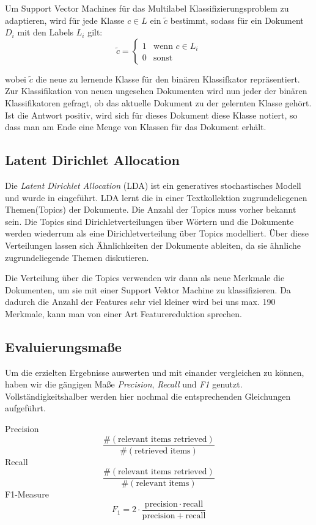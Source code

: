 Um Support Vector Machines für das Multilabel Klassifizierungsproblem zu adaptieren, wird für jede Klasse $c \in L$ ein $\tilde c$ bestimmt, sodass für ein Dokument $D_i$ mit den Labels $L_i$ gilt:
\[
    \tilde c =
    \begin{cases}
        1 &\mbox{wenn } c \in L_i \\
        0 &\mbox{sonst}
    \end{cases}
\]

wobei $\tilde c$ die neue zu lernende Klasse für den binären Klassifkator repräsentiert.
Zur Klassifikation von neuen ungesehen Dokumenten wird nun jeder der binären Klassifikatoren gefragt, ob das aktuelle Dokument zu der gelernten Klasse gehört.
Ist die Antwort positiv, wird sich für dieses Dokument diese Klasse notiert, so dass man am Ende eine Menge von Klassen für das Dokument erhält.


\subsection{Latent Dirichlet Allocation}
\label{sub:latent_dirichlet_allocation}

Die \emph{Latent Dirichlet Allocation} (LDA) ist ein generatives stochastisches Modell und wurde in \cite{Blei:2003:LDA:944919.944937} eingeführt.
LDA lernt die in einer Textkollektion zugrundeliegenen Themen(Topics) der Dokumente. Die Anzahl der Topics muss vorher bekannt sein.
Die Topics sind Dirichletverteilungen über Wörtern und die Dokumente werden wiederrum als eine Dirichletverteilung über Topics modelliert.
Über diese Verteilungen lassen sich Ähnlichkeiten der Dokumente ableiten, da sie ähnliche zugrundeliegende Themen diskutieren.

Die Verteilung über die Topics verwenden wir dann als neue Merkmale die Dokumenten, um sie mit einer Support Vektor Machine zu klassifizieren.
Da dadurch die Anzahl der Features sehr viel kleiner wird bei uns max. 190 Merkmale, kann man von einer Art Featurereduktion sprechen.

\subsection{Evaluierungsmaße}
Um die erzielten Ergebnisse auswerten und mit einander vergleichen zu können, haben wir die gängigen Maße \emph{Precision}, \emph{Recall} und \emph{F1} genutzt.
Vollständigkeitshalber werden hier nochmal die entsprechenden Gleichungen aufgeführt.

Precision \[\frac{\#(\text{relevant items retrieved})}{\#(\text{retrieved items})}\]
Recall \[\frac{\#(\text{relevant items retrieved})}{\#(\text{relevant items})}\]
F1-Measure \[F_1 = 2 \cdot \frac{\mathrm{precision} \cdot \mathrm{recall}}{\mathrm{precision} + \mathrm{recall}}\]

